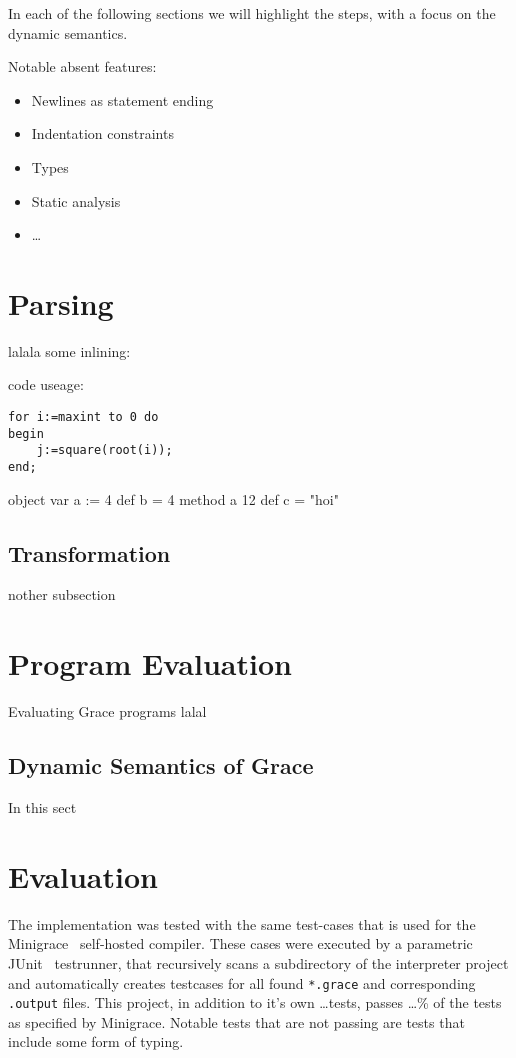 \documentclass[a4paper,UKenglish]{lipics-v2016}
\begin{document}
In each of the following sections we will highlight the steps, with a focus on the dynamic semantics.

Notable absent features:
\begin{itemize}
	\item Newlines as statement ending
	\item Indentation constraints
	\item Types
	\item Static analysis
	\item \dots
\end{itemize}

\section{Parsing}
lalala some inlining: 

code useage:



\begin{lstlisting}[caption={Useless code},label=list:8-6,captionpos=t,float,abovecaptionskip=-\medskipamount]
for i:=maxint to 0 do 
begin 
    j:=square(root(i));
end;
\end{lstlisting}

\begin{grace}
object {
	var a := 4
	def b = 4
	method a {
		12
	}
	def c = "hoi"	
}
\end{grace}

\subsection{Transformation}
nother subsection

\section{Program Evaluation}
Evaluating Grace programs lalal

\subsection{Dynamic Semantics of Grace}
In this sect

\section{Evaluation}
The implementation was tested with the same test-cases that is used for the Minigrace~\cite{minigrace} self-hosted compiler. These cases were executed by a parametric JUnit~\cite{junit} testrunner, that recursively scans a subdirectory of the interpreter project and automatically creates testcases for all found \verb!*.grace! and corresponding \verb!.output! files. This project, in addition to it's own \dots tests, passes \dots \% of the tests as specified by Minigrace. Notable tests that are not passing are tests that include some form of typing.
\end{document}
